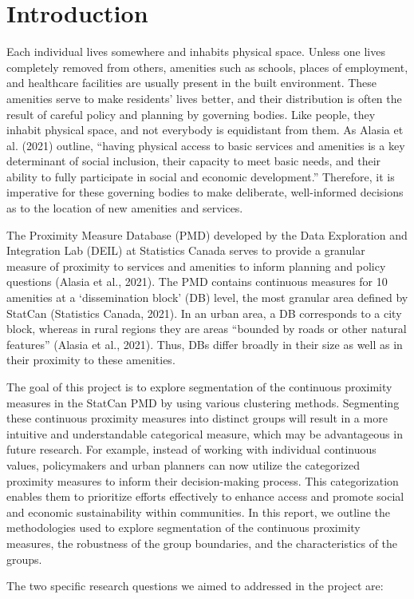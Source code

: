 \documentclass[11pt, a4paper]{article}
\begin{document}
\section{Introduction}
\par
Each individual lives somewhere and inhabits physical space. Unless one lives completely removed from others, amenities such as schools, places of employment, and healthcare facilities are usually present in the built environment. These amenities serve to make residents’ lives better, and their distribution is often the result of careful policy and planning by governing bodies. Like people, they inhabit physical space, and not everybody is equidistant from them. As Alasia et al. (2021) outline, ``having physical access to basic services and amenities is a key determinant of social inclusion, their capacity to meet basic needs, and their ability to fully participate in social and economic development.'' Therefore, it is imperative for these governing bodies to make deliberate, well-informed decisions as to the location of new amenities and services.
\par
The Proximity Measure Database (PMD) developed by the Data Exploration and Integration Lab (DEIL) at Statistics Canada serves to provide a granular measure of proximity to services and amenities to inform planning and policy questions (Alasia et al., 2021). The PMD contains continuous measures for 10 amenities at a ‘dissemination block’ (DB) level, the most granular area defined by StatCan (Statistics Canada, 2021). In an urban area, a DB corresponds to a city block, whereas in rural regions they are areas ``bounded by roads or other natural features'' (Alasia et al., 2021). Thus, DBs differ broadly in their size as well as in their proximity to these amenities.
\par
The goal of this project is to explore segmentation of the continuous proximity measures in the StatCan PMD by using various clustering methods. Segmenting these continuous proximity measures into distinct groups will result in a more intuitive and understandable categorical measure, which may be advantageous in future research. For example, instead of working with individual continuous values, policymakers and urban planners can now utilize the categorized proximity measures to inform their decision-making process. This categorization enables them to prioritize efforts effectively to enhance access and promote social and economic sustainability within communities. In this report, we outline the methodologies used to explore segmentation of the continuous proximity measures, the robustness of the group boundaries, and the characteristics of the groups.
\par
The two specific research questions we aimed to addressed in the project are:
\end{document}
